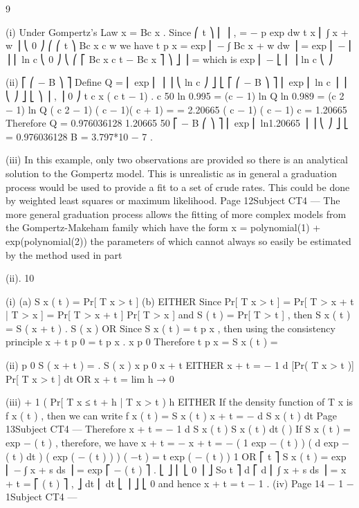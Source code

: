 9
\item (i)
Under Gompertz’s Law
\mu x = Bc x .
Since
⎛ t
⎞
⎜
⎟ ,
=
−
\mu
p
exp
dw
t x
⎜ ∫ x + w ⎟
⎝ 0
⎠
⎛
⎛ t
⎞
Bc x c w
we have t p x = exp ⎜ − ∫ Bc x + w dw ⎟ = exp ⎜ −
⎜
⎟
⎜
ln c
⎝ 0
⎠
⎝
⎛ ⎡ Bc x c t − Bc x ⎤ ⎞
⎦ ⎟ =
which is exp ⎜ − ⎣
⎜
⎟
ln c
⎝
⎠
\item (ii)
⎡
⎛ − B ⎞ ⎤
Define Q = ⎢ exp ⎜
⎟ ⎥
⎝ ln c ⎠ ⎦
⎣
⎡
⎛ − B ⎞ ⎤
⎢ exp ⎜ ln c ⎟ ⎥
⎝
⎠ ⎦
⎣
⎞
⎟ ,
⎟
0 ⎠
t
c x ( c t − 1)
.
c 50
ln 0.995 = (c − 1) ln Q
ln 0.989 = (c 2 − 1) ln Q
( c 2 − 1) ( c − 1)( c + 1)
=
= 2.20665
( c − 1)
( c − 1)
c = 1.20665
Therefore Q = 0.976036128
1.20665 50
⎡
− B
⎛
⎞ ⎤
⎢ exp ⎜ ln1.20665 ⎟ ⎥
⎝
⎠ ⎦
⎣
= 0.976036128
B = 3.797*10 − 7 .
\item (iii)
In this example, only two observations are provided so there is an analytical
solution to the Gompertz model.
This is unrealistic as in general a graduation process would be used to provide
a fit to a set of crude rates.
This could be done by weighted least squares or maximum likelihood.
Page 12Subject CT4 — %
The more general graduation process allows the fitting of more complex
models from the Gompertz-Makeham family which have the form
\mu x = polynomial(1) + exp(polynomial(2))
the parameters of which cannot always so easily be estimated by the method
used in part \item (ii).
10
\item (i)
(a) S x ( t ) = Pr[ T x > t ]
(b) EITHER
Since Pr[ T x > t ] = Pr[ T > x + t | T > x ] =
Pr[ T > x + t ]
Pr[ T > x ]
and S ( t ) = Pr[ T > t ] ,
then S x ( t ) =
S ( x + t )
.
S ( x )
OR
Since S x ( t ) = t p x , then using the consistency principle
x + t p 0 = t p x . x p 0
Therefore t p x = S x ( t ) =
\item (ii)
p 0 S ( x + t )
=
.
S ( x )
x p 0
x + t
EITHER
\mu x + t = −
1
d
[Pr( T x > t )]
Pr[ T x > t ] dt
OR
\mu x + t = lim
h → 0
\item (iii)
+
1
( Pr[ T x ≤ t + h | T x > t )
h
EITHER
If the density function of T x is f x ( t ) , then we can write
f x ( t ) = S x ( t ) \mu x + t = −
d
S x ( t )
dt
Page 13Subject CT4 — %
Therefore \mu x + t = −
1 d
S x ( t )
S x ( t ) dt
(
)
If S x ( t ) = exp − ( \lambda t ) \beta , therefore, we have
\mu x + t = −
\mu x + t = −
(
1
exp − ( \lambda t ) \beta
)
(
d
exp − ( \lambda t ) \beta
dt
)
( exp ( − ( \lambda t ) ) ) ( −\lambda \beta t ) = \lambda \beta t
exp ( − ( \lambda t ) )
1
\beta
\beta
OR
⎡ t
⎤
S x ( t ) = exp ⎢ − ∫ \mu x + s ds ⎥ = exp ⎡ − ( \lambda t ) \beta ⎤ .
⎣
⎦
⎢ ⎣ 0
⎥ ⎦
So
t
⎤
d ⎡
d
⎢ ∫ \mu x + s ds ⎥ = \mu x + t = ⎡ ( \lambda t ) \beta ⎤ ,
⎦
dt ⎢
dt ⎣
⎥ ⎦
⎣ 0
and hence
\mu x + t = \beta\lambda \beta t \beta− 1 .
(iv)
Page 14
\beta
\beta− 1
\beta
\beta− 1Subject CT4 — %


